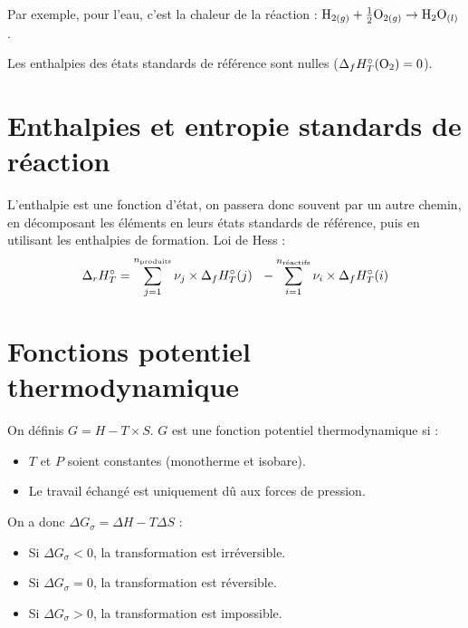 \documentclass[13pt, twoside, a4paper, french]{report}
\begin{document}
            Par exemple, pour l'eau, c'est la chaleur de la réaction : $\textrm{H}_{2(g)} + \frac{1}{2} \textrm{O}_{2(g)} \rightarrow \textrm{H}_2\textrm{O}_{(l)}$.
            \smallskip

            Les enthalpies des états standards de référence sont nulles ($\Delta_f H^\circ_T(\textrm{O}_2) = 0$).


    \section{Enthalpies et entropie standards de réaction}

        L'enthalpie est une fonction d'état, on passera donc souvent par un autre chemin, en décomposant les éléments en leurs états standards de référence, puis en utilisant les enthalpies de formation.
        Loi de Hess :
        \[\Delta_r H^\circ_T = \sum^{n_\textrm{produits}}_{j=1} \nu_j \times \Delta_f H^\circ_T(j)\ \ - \sum^{n_\textrm{réactifs}}_{i=1} \nu_i \times \Delta_f H^\circ_T(i)\]


    \section{Fonctions potentiel thermodynamique}

        On définis $G = H - T \times S$. $G$ est une fonction potentiel thermodynamique si :
        \begin{itemize}
            \item $T$ et $P$ soient constantes (monotherme et isobare).
            \item Le travail échangé est uniquement dû aux forces de pression.
        \end{itemize}
        On a donc $\Delta G_\sigma = \Delta H - T \Delta S $ :
        \begin{itemize}
            \item Si $\Delta G_\sigma < 0$, la transformation est irréversible.
            \item Si $\Delta G_\sigma = 0$, la transformation est réversible.
            \item Si $\Delta G_\sigma > 0$, la transformation est impossible.
        \end{itemize}
\end{document}
